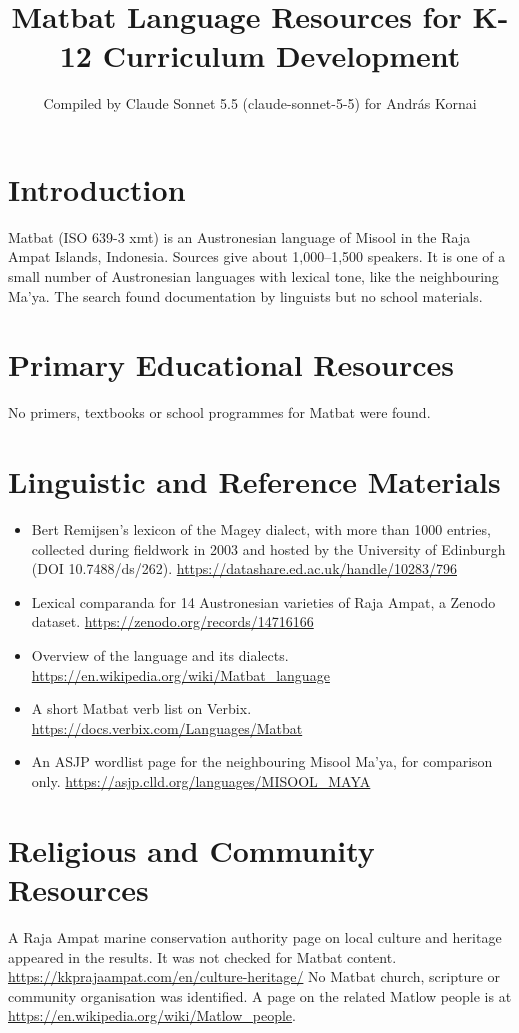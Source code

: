 \documentclass[12pt]{article}
\title{Matbat Language Resources for K-12 Curriculum Development}
\author{Compiled by Claude Sonnet 5.5 (claude-sonnet-5-5) for Andr\'as Kornai}
\date{}
\begin{document}
\maketitle

\section{Introduction}
Matbat (ISO 639-3 xmt) is an Austronesian language of Misool in the Raja Ampat Islands, Indonesia. Sources give about 1,000--1,500 speakers. It is one of a small number of Austronesian languages with lexical tone, like the neighbouring Ma'ya. The search found documentation by linguists but no school materials.

\section{Primary Educational Resources}
No primers, textbooks or school programmes for Matbat were found.

\section{Linguistic and Reference Materials}
\begin{itemize}
\item Bert Remijsen's lexicon of the Magey dialect, with more than 1000 entries, collected during fieldwork in 2003 and hosted by the University of Edinburgh (DOI 10.7488/ds/262). \url{https://datashare.ed.ac.uk/handle/10283/796}
\item Lexical comparanda for 14 Austronesian varieties of Raja Ampat, a Zenodo dataset. \url{https://zenodo.org/records/14716166}
\item Overview of the language and its dialects. \url{https://en.wikipedia.org/wiki/Matbat_language}
\item A short Matbat verb list on Verbix. \url{https://docs.verbix.com/Languages/Matbat}
\item An ASJP wordlist page for the neighbouring Misool Ma'ya, for comparison only. \url{https://asjp.clld.org/languages/MISOOL_MAYA}
\end{itemize}

\section{Religious and Community Resources}
A Raja Ampat marine conservation authority page on local culture and heritage appeared in the results. It was not checked for Matbat content. \url{https://kkprajaampat.com/en/culture-heritage/} No Matbat church, scripture or community organisation was identified. A page on the related Matlow people is at \url{https://en.wikipedia.org/wiki/Matlow_people}.
\end{document}

